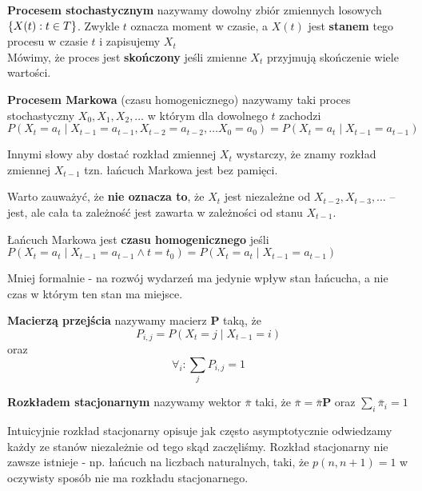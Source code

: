 \begin{definition}
    \textbf{Procesem stochastycznym} nazywamy dowolny zbiór zmiennych losowych \(\set{X(t) : t \in T}\).
    Zwykle \(t\) oznacza moment w czasie, a \(X(t)\) jest \textbf{stanem} tego procesu w czasie \(t\) i zapisujemy \(X_t\) \\
    Mówimy, że proces jest \textbf{skończony} jeśli zmienne \(X_t\) przyjmują skończenie wiele wartości.
\end{definition}

\begin{definition}
    \textbf{Procesem Markowa} (czasu homogenicznego) nazywamy taki proces stochastyczny \(X_0, X_1, X_2, \dots\) w którym dla dowolnego \(t\) zachodzi
    \[ 
        P(X_t = a_t \mid X_{t-1} = a_{t-1}, X_{t-2} = a_{t-2}, \dots X_0 = a_0) =
        P(X_t = a_t \mid X_{t-1} = a_{t-1}) 
    \]
\end{definition}

Innymi słowy aby dostać rozkład zmiennej \(X_t\) wystarczy, że znamy rozkład zmiennej \(X_{t-1}\) tzn. łańcuch Markowa jest bez pamięci.

Warto zauważyć, że \textbf{nie oznacza to}, że \(X_t\) jest niezależne od \(X_{t-2}, X_{t-3}, \dots\) --
jest, ale cała ta zależność jest zawarta w zależności od stanu \(X_{t-1}\).

\begin{definition}
    Łańcuch Markowa jest \textbf{czasu homogenicznego} jeśli \(
    P(X_t = a_t \mid X_{t-1} = a_{t-1} \land t = t_0) = P(X_t = a_t \mid X_{t-1} = a_{t-1})
    \)
\end{definition}
Mniej formalnie - na rozwój wydarzeń ma jedynie wpływ stan łańcucha, a nie czas w którym ten stan ma miejsce.

\begin{definition}
    \textbf{Macierzą przejścia} nazywamy macierz \(\mathbf{P}\) taką, że 
    \[
        P_{i, j} = P(X_t = j \mid X_{t-1} = i)
    \]
    oraz
    \[
        \forall_i : \sum_j P_{i, j} = 1
    \]
\end{definition}

\begin{definition}
    \textbf{Rozkładem stacjonarnym} nazywamy wektor \( \bar \pi \) taki, że \( \bar \pi = \bar \pi \mathbf{P} \) oraz \( \sum_i \bar \pi_i = 1 \)
\end{definition}
Intuicyjnie rozkład stacjonarny opisuje jak często asymptotycznie odwiedzamy każdy ze stanów niezależnie od tego skąd zaczęliśmy. Rozkład stacjonarny nie zawsze istnieje - np. łańcuch na liczbach naturalnych, taki, że \( p(n, n + 1) = 1\) w oczywisty sposób nie ma rozkładu stacjonarnego.

